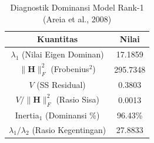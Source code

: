 \begin{table}[H]
\centering
\small
\caption{Diagnostik Dominansi Model Rank-1 (Areia et al., 2008)} \label{tab:samplestruktur_diagnostik}
\begin{tabular}{|c|c|}
\hline
\textbf{Kuantitas} & \textbf{Nilai} \\
\hline
$\lambda_1$ (Nilai Eigen Dominan) & 17.1859 \\
$\|\mathbf{H}\|_F^2$ (Frobenius$^2$) & 295.7348 \\
$V$ (SS Residual) & 0.3803 \\
$V / \|\mathbf{H}\|_F^2$ (Rasio Sisa) & 0.0013 \\
Inertia$_1$ (Dominansi \%) & 96.43\% \\
$\lambda_1 / \lambda_2$ (Rasio Kegentingan) & 27.8833 \\
\hline
\end{tabular}
\end{table}